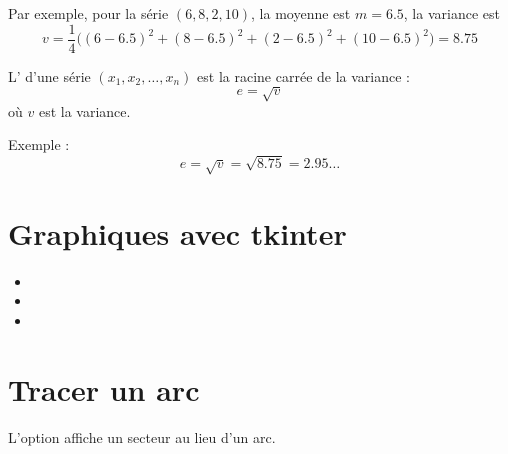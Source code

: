\documentclass[11pt,class=report,crop=false]{standalone}
\begin{document}
  \bigskip  
  
  Par exemple, pour la série $(6,8,2,10)$, la moyenne est $m = 6.5$, la variance est
  $$v = \frac{1}{4} \big((6-6.5)^2 + (8-6.5)^2 + (2-6.5)^2 + (10-6.5)^2\big) = 8.75$$
  
  \bigskip
   
  \bigskip
   
   L' d'une série $(x_1,x_2,\ldots,x_n)$ est la racine carrée de la variance :
  $$e = \sqrt{v}$$
  où $v$ est la variance.
  
   \bigskip 
   Exemple :
    $$e = \sqrt{v} = \sqrt{8.75} = 2.95\ldots $$


\newpage

\section*{Graphiques avec tkinter}




\begin{itemize}

  \item {}
  
  \item  {}
  
  \item {} 
  
\end{itemize}


\newpage

\section*{Tracer un arc}

\centerline{}



L'option  affiche un secteur au lieu d'un arc. 




\end{document}
